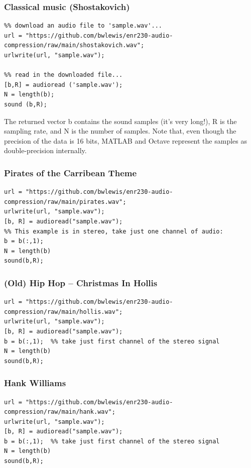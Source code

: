 \documentclass[10pt]{article}
\begin{document}
\subsubsection*{Classical music (Shostakovich)}
\begin{verbatim}
%% download an audio file to 'sample.wav'...
url = "https://github.com/bwlewis/enr230-audio-compression/raw/main/shostakovich.wav";
urlwrite(url, "sample.wav");

%% read in the downloaded file...
[b,R] = audioread ('sample.wav');
N = length(b);
sound (b,R);
\end{verbatim}
The returned vector b contains the sound samples (it's very long!), R is the
sampling rate, and N is the number of samples. Note that, even though the
precision of the data is 16 bits, MATLAB and Octave represent the samples as
double-precision internally.

\subsubsection*{Pirates of the Carribean Theme}
\begin{verbatim}
url = "https://github.com/bwlewis/enr230-audio-compression/raw/main/pirates.wav";
urlwrite(url, "sample.wav");
[b, R] = audioread("sample.wav");
%% This example is in stereo, take just one channel of audio:
b = b(:,1);
N = length(b)
sound(b,R);
\end{verbatim}

\subsubsection*{(Old) Hip Hop -- Christmas In Hollis}
\begin{verbatim}
url = "https://github.com/bwlewis/enr230-audio-compression/raw/main/hollis.wav";
urlwrite(url, "sample.wav");
[b, R] = audioread("sample.wav");
b = b(:,1);  %% take just first channel of the stereo signal
N = length(b)
sound(b,R);
\end{verbatim}

\subsubsection*{Hank Williams}
\begin{verbatim}
url = "https://github.com/bwlewis/enr230-audio-compression/raw/main/hank.wav";
urlwrite(url, "sample.wav");
[b, R] = audioread("sample.wav");
b = b(:,1);  %% take just first channel of the stereo signal
N = length(b)
sound(b,R);
\end{verbatim}
\end{document}
